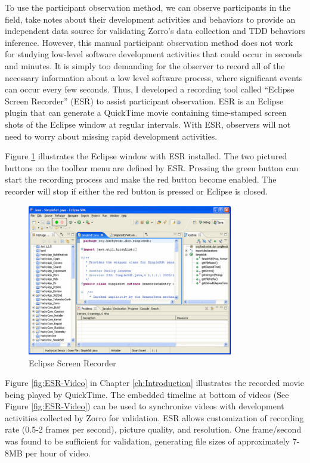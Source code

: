 To use the participant observation method, we can observe participants in the field, take notes about their development activities and behaviors to provide an independent data source for validating Zorro's data collection and TDD behaviors inference. However, this manual participant observation method \cite{Creswell:03} does not work for studying low-level software development activities that could occur in seconds and minutes. It is simply too demanding for the observer to record all of the necessary information about a low level software process, where significant events can occur every few seconds. Thus, I developed a recording tool called ``Eclipse Screen Recorder'' (ESR) to assist participant observation. ESR is an Eclipse plugin that can generate a QuickTime movie containing time-stamped screen shots of the Eclipse window at regular intervals. With ESR, observers will not need to worry about missing rapid development activities. 

Figure \ref{fig:ESR} illustrates the Eclipse window with ESR installed. The two pictured buttons on the toolbar menu are defined by ESR. Pressing the green button can start the recording process and make the red button become enabled. The recorder will stop if either the red button is pressed or Eclipse is closed. 
\begin{figure}[htbp]
  \centering
  \includegraphics[width=0.8\textwidth]{figs/ESR}
  \caption{Eclipse Screen Recorder}
  \label{fig:ESR}
\end{figure}
Figure \ref{fig:ESR-Video} in Chapter \ref{ch:Introduction} illustrates the recorded movie being played by QuickTime. The embedded timeline at bottom of videos (See Figure \ref{fig:ESR-Video}) can be used to synchronize videos with development activities collected by Zorro for validation. ESR allows customization of recording rate (0.5-2 frames per second), picture quality, and resolution. One frame/second was found to be sufficient for validation, generating file sizes of approximately 7-8MB per hour of video. 

